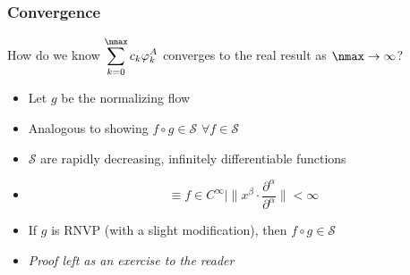 \begin{frame}
    \frametitle{Convergence}
    How do we know $\displaystyle{\sum_{k=0}^{\nmax}c_k \varphi_k^A}$ converges to the real result as ${\nmax} \to \infty$?
    \begin{itemize}[<+->]
        \item Let $g$ be the normalizing flow
        \item Analogous to showing $f \circ g \in \mathcal{S}\,\, \forall f \in \mathcal{S}$
        \item $\mathcal{S}$ are rapidly decreasing, infinitely differentiable functions
        \item \[ \equiv f \in C^\infty | \|x^\beta \cdot \frac{\partial^\alpha}{\partial^\alpha}\| < \infty \]
        \item If $g$ is RNVP (with a slight modification), then $f \circ g \in \mathcal{S}$
        \item \textit{Proof left as an exercise to the reader}
    \end{itemize}
\end{frame}